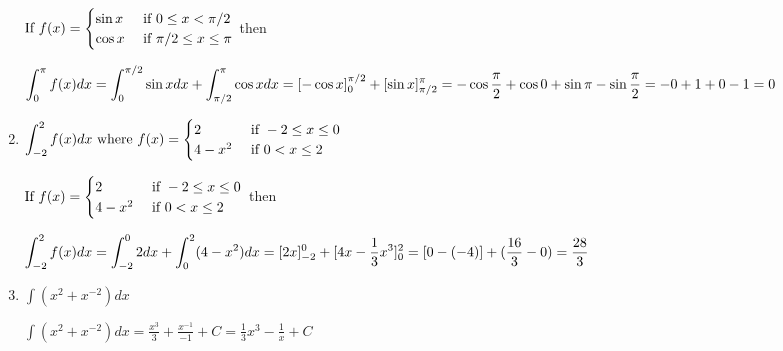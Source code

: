 \begin{enumerate}[1.]
\begin{Solution}
  $\displaystyle \text{If } f(x) = 
    \begin{cases}
      \sin x  & \text{ if } 0 \leq x < \pi / 2 \\
      \cos x  & \text{ if } \pi / 2 \leq x \leq \pi \\
    \end{cases}
    $ then
    
    $\displaystyle \int_{0}^{\pi} f(x) dx = 
    \int_0^{\pi/2} \sin x dx + \int_{\pi/2}^{\pi} \cos x dx =
    [ - \cos x]_0^{\pi/2} + [ \sin x ]_{\pi / 2}^{\pi} =
    - \cos \frac{\pi}{2} + \cos 0 + \sin \pi - \sin \frac{\pi}{2} = 
    -0 + 1 + 0 - 1 = 0$
\end{Solution}

\item \begin{Question}
    
$\displaystyle    \int_{-2}^2 f(x) dx \text{ where } f(x) = 
    \begin{cases}
      2  & \text{ if } -2 \leq x \leq 0 \\
      4 - x^2 & \text{ if } 0 < x \leq 2 \\
    \end{cases}
  $ 
\end{Question}

\begin{Solution}
  $\displaystyle \text{If } f(x) =
    \begin{cases}
      2  & \text{ if } -2 \leq x \leq 0 \\
      4 - x^2 & \text{ if } 0 < x \leq 2 \\
    \end{cases}
    $ then
    
    $\displaystyle \int_{-2}^{2} f(x) dx =
    \int_{-2}^{0} 2 dx + \int_0^2 (4 - x^2) dx = 
    [2x]_{-2}^{0} + [4x - \frac{1}{3} x^3 ]_0^2 =
    [0 - (-4)] + (\frac{16}{3} - 0) = \frac{28}{3}$
    
\end{Solution}

\item
\begin{Question}
    $\int (x^2 + x^{-2}) dx$
\end{Question}

\begin{Solution}
    $\int (x^2 + x^{-2})dx = \frac{x^3}{3} + \frac{x^{-1}}{-1} + C =
      \frac{1}{3} x^3 - \frac{1}{x} + C$
    
\end{Solution}
      

\end{enumerate}
